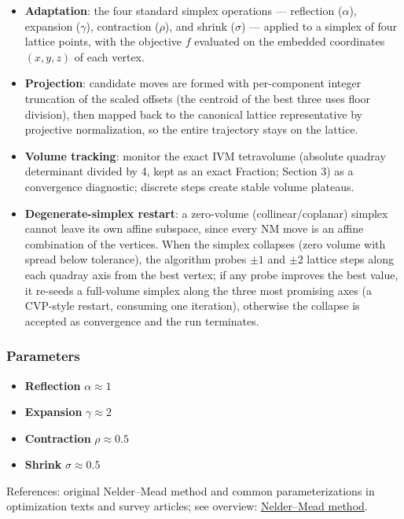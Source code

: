 \documentclass[
  10pt,
]{article}
\providecommand{\tightlist}{%
  \setlength{\itemsep}{0pt}\setlength{\parskip}{0pt}}
\begin{document}
\begin{itemize}
\tightlist
\item
  \textbf{Adaptation}: the four standard simplex operations ---
  reflection (\(\alpha\)), expansion (\(\gamma\)), contraction
  (\(\rho\)), and shrink (\(\sigma\)) --- applied to a simplex of four
  lattice points, with the objective \(f\) evaluated on the embedded
  coordinates \((x, y, z)\) of each vertex.
\item
  \textbf{Projection}: candidate moves are formed with per-component
  integer truncation of the scaled offsets (the centroid of the best
  three uses floor division), then mapped back to the canonical lattice
  representative by projective normalization, so the entire trajectory
  stays on the lattice.
\item
  \textbf{Volume tracking}: monitor the exact IVM tetravolume (absolute
  quadray determinant divided by 4, kept as an exact Fraction; Section
  3) as a convergence diagnostic; discrete steps create stable volume
  plateaus.
\item
  \textbf{Degenerate-simplex restart}: a zero-volume
  (collinear/coplanar) simplex cannot leave its own affine subspace,
  since every NM move is an affine combination of the vertices. When the
  simplex collapses (zero volume with spread below tolerance), the
  algorithm probes \(\pm 1\) and \(\pm 2\) lattice steps along each
  quadray axis from the best vertex; if any probe improves the best
  value, it re-seeds a full-volume simplex along the three most
  promising axes (a CVP-style restart, consuming one iteration),
  otherwise the collapse is accepted as convergence and the run
  terminates.
\end{itemize}

\subsubsection{Parameters}\label{parameters}

\begin{itemize}
\tightlist
\item
  \textbf{Reflection} \(\alpha \approx 1\)
\item
  \textbf{Expansion} \(\gamma \approx 2\)
\item
  \textbf{Contraction} \(\rho \approx 0.5\)
\item
  \textbf{Shrink} \(\sigma \approx 0.5\)
\end{itemize}

References: original Nelder--Mead method and common parameterizations in
optimization texts and survey articles; see overview:
\href{https://en.wikipedia.org/wiki/Nelder\%E2\%80\%93Mead_method}{Nelder--Mead
method}.
\end{document}
